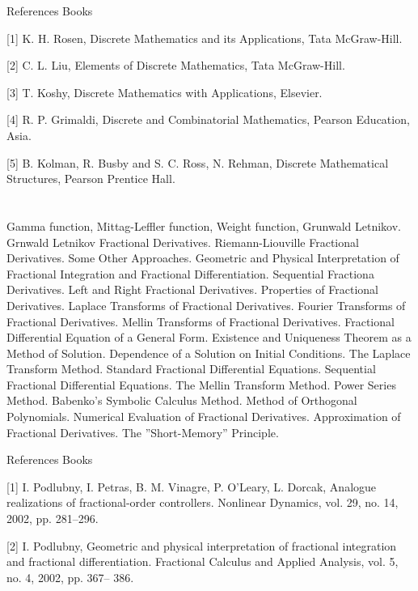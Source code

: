  

References Books  

[1] K. H. Rosen, Discrete Mathematics and its Applications, Tata McGraw-Hill.  

[2] C. L. Liu, Elements of Discrete Mathematics, Tata McGraw-Hill.  

[3] T. Koshy, Discrete Mathematics with Applications, Elsevier.  

[4] R. P. Grimaldi, Discrete and Combinatorial Mathematics, Pearson Education, Asia.  

[5] B. Kolman, R. Busby and S. C. Ross, N. Rehman, Discrete Mathematical Structures, Pearson Prentice Hall. 

 

  
\section{\dsccourseinfo}


Gamma function, Mittag-Leffler function, Weight function, Grunwald Letnikov. Grnwald Letnikov Fractional Derivatives. Riemann-Liouville Fractional Derivatives. Some Other Approaches. Geometric and Physical Interpretation of Fractional Integration and Fractional Differentiation. Sequential Fractiona Derivatives. Left and Right Fractional Derivatives. Properties of Fractional Derivatives. Laplace Transforms of Fractional Derivatives. Fourier Transforms of Fractional Derivatives. Mellin Transforms of Fractional Derivatives. Fractional Differential Equation of a General Form. Existence and Uniqueness Theorem as a Method of Solution. Dependence of a Solution on Initial Conditions. The Laplace Transform Method. Standard Fractional Differential Equations. Sequential Fractional Differential Equations. The Mellin Transform Method. Power Series Method. Babenko’s Symbolic Calculus Method. Method of Orthogonal Polynomials. Numerical Evaluation of Fractional Derivatives. Approximation of Fractional Derivatives. The ”Short-Memory” Principle.

References Books  

[1] I. Podlubny, I. Petras, B. M. Vinagre, P. O’Leary, L. Dorcak, Analogue realizations of fractional-order controllers. Nonlinear Dynamics, vol. 29, no. 14, 2002, pp. 281–296.  

[2] I. Podlubny, Geometric and physical interpretation of fractional integration and fractional differentiation. Fractional Calculus and Applied Analysis, vol. 5, no. 4, 2002, pp. 367– 386.  

